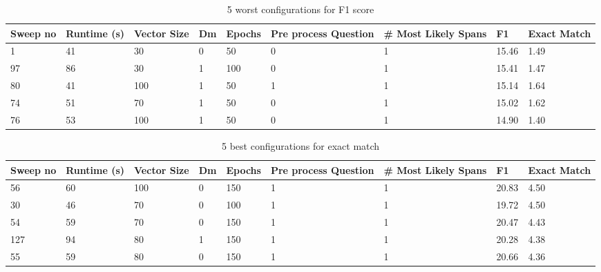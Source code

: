 \documentclass[11pt]{article}
\begin{document}
    \begin{table}[p]
        \centering
        \begin{tabularx}{\textwidth}{|X|X|X|X|X|X|X|X|X|}
            \hline
            Sweep no & Runtime (s) & Vector Size & Dm & Epochs & Pre process Question & \# Most Likely Spans & F1 & Exact Match \\ \hline
            1        & 41          & 30          & 0  & 50     & 0                    & 1                    & 15.46 & 1.49        \\ \hline
            97       & 86          & 30          & 1  & 100    & 0                    & 1                    & 15.41 & 1.47        \\ \hline
            80       & 41          & 100         & 1  & 50     & 1                    & 1                    & 15.14 & 1.64        \\ \hline
            74       & 51          & 70          & 1  & 50     & 0                    & 1                    & 15.02 & 1.62        \\ \hline
            76       & 53          & 100         & 1  & 50     & 0                    & 1                    & 14.90 & 1.40        \\ \hline
        \end{tabularx}
        \caption{5 worst configurations for F1 score}
        \label{table:5-worst-f1}
    \end{table}

    \begin{table}[p]
        \centering
        \begin{tabularx}{\textwidth}{|X|X|X|X|X|X|X|X|X|}
            \hline
            Sweep no & Runtime (s) & Vector Size & Dm & Epochs & Pre process Question & \# Most Likely Spans & F1 & Exact Match \\ \hline
            56       & 60          & 100         & 0  & 150    & 1                    & 1                    & 20.83 & 4.50        \\ \hline
            30       & 46          & 70          & 0  & 100    & 1                    & 1                    & 19.72 & 4.50        \\ \hline
            54       & 59          & 70          & 0  & 150    & 1                    & 1                    & 20.47 & 4.43        \\ \hline
            127      & 94          & 80          & 1  & 150    & 1                    & 1                    & 20.28 & 4.38        \\ \hline
            55       & 59          & 80          & 0  & 150    & 1                    & 1                    & 20.66 & 4.36        \\ \hline
        \end{tabularx}
        \caption{5 best configurations for exact match}
        \label{table:5-best-exact}
    \end{table}
\end{document}

